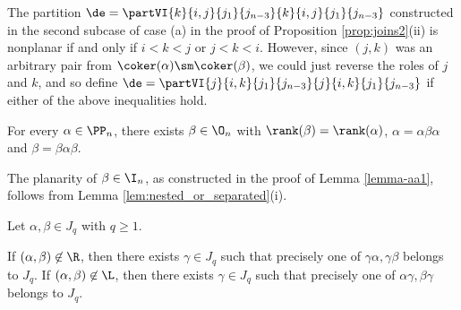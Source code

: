 \pf 
The partition $\de=\partVI{k}{i,j}{j_1}{j_{n-3}}{k}{i,j}{j_1}{j_{n-3}}$ constructed in the second subcase of case (a) in the proof of Proposition \ref{prop:joins2}(ii) is nonplanar if and only if $i<k<j$ or $j<k<i$.  However, since $(j,k)$ was an arbitrary pair from $\coker(\alpha)\sm\coker(\beta)$, we could just reverse the roles of $j$ and $k$, and so define $\de=\partVI{j}{i,k}{j_1}{j_{n-3}}{j}{i,k}{j_1}{j_{n-3}}$ if either of the above inequalities hold.   \epf


\begin{lemma}
\label{lemma-aa1:PPn}
For every $\alpha\in\PP_n$, there exists $\beta\in\O_n$ with $\rank(\beta)=\rank(\alpha)$, $\alpha=\alpha\beta\alpha$ and $\beta=\beta\alpha\beta$.
\end{lemma}

\pf
The planarity of $\beta\in\I_n$, as constructed in the proof of Lemma \ref{lemma-aa1}, follows from Lemma \ref{lem:nested_or_separated}(i).
\epf


\begin{lemma}
\label{lemma-aa1b:PPn}
Let $\alpha,\beta\in J_q$ with $q\geq1$.  
\begin{itemize}
 If $(\alpha,\beta)\not\in{\R}$, then there exists $\gamma\in J_q$ such that precisely one of $\gamma\alpha,\gamma\beta$ belongs to $J_q$.
 If $(\alpha,\beta)\not\in{\L}$, then there exists $\gamma\in J_q$ such that precisely one of $\alpha\gamma,\beta\gamma$ belongs to $J_q$.
\end{itemize}
\end{lemma}

